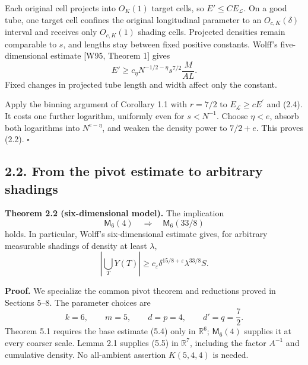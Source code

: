 \documentclass[
  11pt,
  a4paper,
]{article}
\begin{document}
Each original cell projects into \(O_K(1)\) target cells, so
\(E'\le CE_{\mathcal L}\). On a good tube, one target cell confines the
original longitudinal parameter to an \(O_{c,K}(\delta)\) interval and
receives only \(O_{c,K}(1)\) shading cells. Projected densities remain
comparable to \(s\), and lengths stay between fixed positive constants.
Wolff's five-dimensional estimate {[}W95, Theorem 1{]} gives \[
 E'\ge c_\eta N^{-1/2-\eta}s^{7/2}\frac{M}{AL}.
 \tag{2.4}\label{eq:2.4}
\] Fixed changes in projected tube length and width affect only the
constant.

Apply the binning argument of Corollary 1.1 with \(r=7/2\) to
\(E_{\mathcal L}\ge cE^{\prime}\) and (2.4). It costs one further
logarithm, uniformly even for \(s<N^{-1}\). Choose \(\eta<e\), absorb
both logarithms into \(N^{e-\eta}\), and weaken the density power to
\(7/2+e\). This proves (2.2). \(\square\)

\hypertarget{from-the-pivot-estimate-to-arbitrary-shadings}{%
\subsection{2.2. From the pivot estimate to arbitrary
shadings}\label{from-the-pivot-estimate-to-arbitrary-shadings}}

\textbf{Theorem 2.2 (six-dimensional model).} The implication \[
 \mathsf M_6(4)\quad\Longrightarrow\quad\mathsf M_6(33/8)
 \tag{2.5}\label{eq:2.5}
\] holds. In particular, Wolff's six-dimensional estimate gives, for
arbitrary measurable shadings of density at least \(\lambda\), \[
 \left|\bigcup_TY(T)\right|
 \ge c_\varepsilon\delta^{15/8+\varepsilon}
       \lambda^{33/8}S.
 \tag{2.6}\label{eq:2.6}
\]

\textbf{Proof.} We specialize the common pivot theorem and reductions
proved in Sections 5--8. The parameter choices are \[
 k=6,\qquad m=5,\qquad d=p=4,
 \qquad d'=q=\frac72.
 \tag{2.7}\label{eq:2.7}
\] Theorem 5.1 requires the base estimate (5.4) only in \(\mathbb R^6\);
\(\mathsf M_6(4)\) supplies it at every coarser scale. Lemma 2.1
supplies (5.5) in \(\mathbb R^7\), including the factor \(A^{-1}\) and
cumulative density. No all-ambient assertion \(K(5,4,4)\) is needed.
\end{document}
